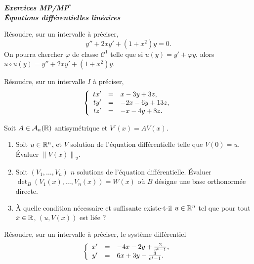 \documentclass[12pt]{article}
\begin{document}
\begin{titlepage}
	\centering
	\vspace*{\fill}
	\Huge \textit{\textbf{Exercices MP/MP$^*$\\ Équations différentielles linéaires}}
	\vspace*{\fill}
\end{titlepage}

\begin{exercise}
	Résoudre, sur un intervalle à préciser,
	\begin{equation}
		y''+2xy'+(1+x^{2})y=0.
	\end{equation}
	On pourra chercher $\varphi$ de classe $\mathcal{C}^{1}$ telle que si $u(y)=y'+\varphi y$, alors $u\circ u(y)=y''+2xy'+(1+x^{2})y$.
\end{exercise}

\begin{exercise}
	Résoudre, sur un intervalle $I$ à préciser,
	\begin{equation}
		\left\lbrace
			\begin{array}[]{rcl}
				tx' &=& x-3y+3z,\\
				ty' &=& -2x-6y+13z,\\
				tz' &=& -x-4y+8z.
			\end{array}
		\right.
	\end{equation}
\end{exercise}

\begin{exercise}
	Soit $A\in\mathcal{A}_n(\mathbb{R})$ antisymétrique et $V'(x)=AV(x)$.
	\begin{enumerate}
		\item Soit $u\in\mathbb{R}^{n}$, et $V$ solution de l'équation différentielle telle que $V(0)=u$. Évaluer $\left\lVert V(x)\right\rVert_{2}$.
		\item Soit $(V_1,\dots,V_n)$ $n$ solutions de l'équation différentielle. Évaluer $\det_{B}(V_1(x),\dots,V_n(x))=W(x)$ où $B$ désigne une base orthonormée directe.
		\item À quelle condition nécessaire et suffisante existe-t-il $u\in\mathbb{R}^{n}$ tel que pour tout $x\in\mathbb{R}$, $(u,V(x))$ est liée ?
	\end{enumerate}
\end{exercise}

\begin{exercise}
	Résoudre, sur un intervalle à préciser, le système différentiel
	\begin{equation}
		\left\lbrace
			\begin{array}[]{rcl}
				x' &=& -4x-2y+\frac{2}{\e^{t}-1},\\
				y' &=& 6x+3y-\frac{3}{\e^{t}-1}.
			\end{array}
		\right.
	\end{equation}
\end{exercise}
\end{document}
